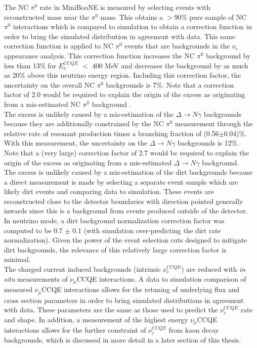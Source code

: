 The NC $\pi^0$ rate in MiniBooNE is measured by selecting events with reconstructed mass near the $\pi^0$ mass. This obtains a $>90$\% pure sample of NC $\pi^0$ interactions which is compared to simulation to obtain a correction function in order to bring the simulated distribution in agreement with data. This same correction function is applied to NC $\pi^0$ events that are backgrounds in the $\nu_e$ appearance analysis. This correction function increases the NC $\pi^0$ background by less than 13\% for $E_\nu^{CCQE}$ $<$ 400 MeV and decreases the background by as much as 20\% above this neutrino energy region. Including this correction factor, the uncertainty on the overall NC $\pi^0$ backgrounds is 7\%. Note that a correction factor of 2.0 would be required to explain the origin of the excess as originating from a mis-estimated NC $\pi^0$ background \cite{GeorgiaThesis}.\\

The excess is unlikely caused by a mis-estimation of the $\Delta\rightarrow N\gamma$ backgrounds because they are additionally constrained by the NC $\pi^0$ measurement through the relative rate of resonant production times a branching fraction of (0.56$\pm$0.04)\%. With this measurement, the uncertainty on the $\Delta\rightarrow N\gamma$ backgrounds is 12\%. Note that a (very large) correction factor of 2.7 would be required to explain the origin of the excess as originating from a mis-estimated $\Delta \rightarrow N\gamma$ background.\\

The excess is unlikely caused by a mis-estimation of the dirt backgrounds because a direct measurement is made by selecting a separate event sample which are likely dirt events and comparing data to simulation. These events are reconstructed close to the detector boundaries with direction pointed generally inwards since this is a background from events produced outside of the detector. In neutrino mode, a dirt background normalization correction factor was computed to be 0.7 $\pm$ 0.1 (with simulation over-predicting the dirt rate normalization). Given the power of the event selection cuts designed to mitigate dirt backgrounds, the relevance of this relatively large correction factor is minimal.\\

The charged current induced backgrounds (intrinsic $\nu_e^{CCQE}$) are reduced with \textit{in situ} measurements of $\nu_\mu$CCQE interactions. A data to simulation comparison of measured $\nu_\mu$CCQE interactions allows for the retuning of underlying flux and cross section parameters in order to bring simulated distributions in agreement with data. These parameters are the same as those used to predict the $\nu_e^{CCQE}$ rate and shape. In addition, a measurement of the highest energy $\nu_\mu$CCQE interactions allows for the further constraint of $\nu_e^{CCQE}$ from kaon decay backgrounds, which is discussed in more detail in a later section of this thesis.\\

